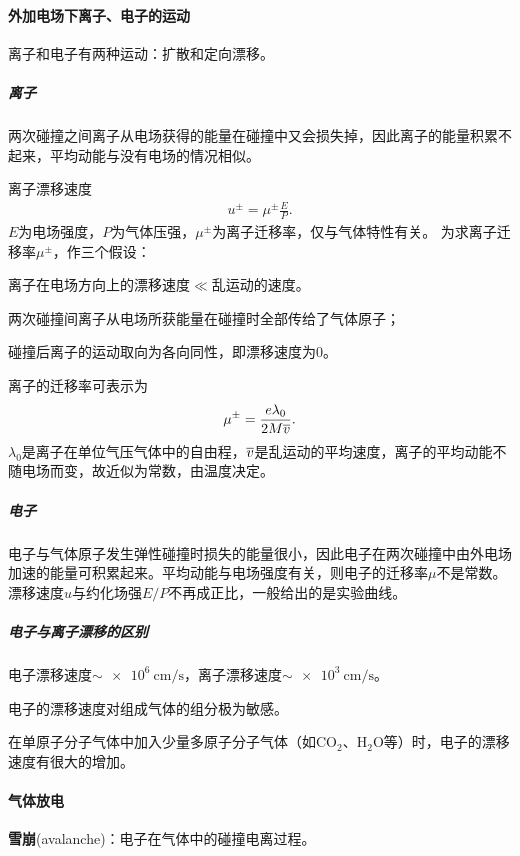 \paragraph{外加电场下离子、电子的运动}
离子和电子有两种运动：扩散和定向漂移。

\subparagraph{离子}
两次碰撞之间离子从电场获得的能量在碰撞中又会损失掉，因此离子的能量积累不起来，平均动能与没有电场的情况相似。

离子漂移速度
\begin{align}
	u^\pm = \mu^\pm\frac EP.
\end{align}
$E$为电场强度，$P$为气体压强，$\mu^\pm$为离子迁移率，仅与气体特性有关。
为求离子迁移率$\mu^\pm$，作三个假设：
\begin{compactenum}
	\item 离子在电场方向上的漂移速度$\ll$乱运动的速度。
	\item 两次碰撞间离子从电场所获能量在碰撞时全部传给了气体原子；
	\item 碰撞后离子的运动取向为各向同性，即漂移速度为0。
\end{compactenum}
离子的迁移率可表示为
\begin{equation}\label{eq:nrd-gas-ion-mobility}
	\mu^\pm = \frac{e\lambda_0}{2M\overline{v}}.
\end{equation}
$\lambda_0$是离子在单位气压气体中的自由程，$\overline{v}$是乱运动的平均速度，离子的平均动能不随电场而变，故近似为常数，由温度决定。

\subparagraph{电子}电子与气体原子发生弹性碰撞时损失的能量很小，因此电子在两次碰撞中由外电场加速的能量可积累起来。平均动能与电场强度有关，则电子的迁移率$\mu$不是常数。漂移速度$u$与约化场强$E/P$不再成正比，一般给出的是实验曲线。

\subparagraph{电子与离子漂移的区别}
\begin{compactenum}
	\item 电子漂移速度$\sim \qty{e6}{\centi\metre\per\second}$，离子漂移速度$\sim \qty{e3}{\centi\metre\per\second}$。
	\item 电子的漂移速度对组成气体的组分极为敏感。
	
	在单原子分子气体中加入少量多原子分子气体（如CO$_2$、H$_2$O等）时，电子的漂移速度有很大的增加。
\end{compactenum}
\paragraph{气体放电}
\textbf{雪崩}(avalanche)：电子在气体中的碰撞电离过程。

